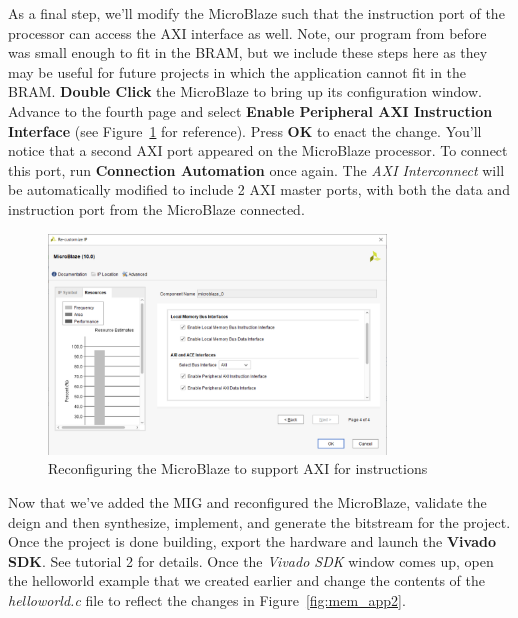 \documentclass[11pt]{article}
\begin{document}
As a final step, we'll modify the MicroBlaze such that the instruction port of the processor can access the AXI interface as well. Note, our program from before was small enough to fit in the BRAM, but we include these steps here as they may be useful for future projects in which the application cannot fit in the BRAM. \textbf{Double Click} the MicroBlaze to bring up its configuration window. Advance to the fourth page and select \textbf{Enable Peripheral AXI Instruction Interface} (see Figure~\ref{fig:uB_add_instr_axi} for reference). Press \textbf{OK} to enact the change. You'll notice that a second AXI port appeared on the MicroBlaze processor. To connect this port, run \textbf{Connection Automation} once again. The \textit{AXI Interconnect} will be automatically modified to include 2 AXI master ports, with both the data and instruction port from the MicroBlaze connected.

\begin{figure}[h]
    \centering
    \includegraphics[width=0.8\textwidth]{images/uB_add_instr_axi.png}
    \caption{Reconfiguring the MicroBlaze to support AXI for instructions}
    \label{fig:uB_add_instr_axi}
\end{figure}

Now that we've added the MIG and reconfigured the MicroBlaze, validate the deign and then synthesize, implement, and generate the bitstream for the project. Once the project is done building, export the hardware and launch the \textbf{Vivado SDK}. See tutorial 2 for details. Once the \textit{Vivado SDK} window comes up, open the helloworld example that we created earlier and change the contents of the \textit{helloworld.c} file to reflect the changes in Figure~\ref{fig:mem_app2}.
\end{document}
